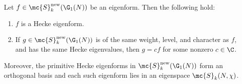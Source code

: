     \begin{theorem}\label{thm:newforms_characterization_holomorphic}
      Let $f \in \mc{S}_{k}^{\mathrm{new}}(\G_{1}(N))$ be an eigenform. Then the following hold:
      \begin{enumerate}[label=(\roman*)]
        \item $f$ is a Hecke eigenform.
        \item If $g \in \mc{S}_{k}^{\mathrm{new}}(\G_{1}(N))$ is of the same weight, level, and character as $f$, and has the same Hecke eigenvalues, then $g = cf$ for some nonzero $c \in \C$.
      \end{enumerate}
      Moreover, the primitive Hecke eigenforms in $\mc{S}_{k}^{\mathrm{new}}(\G_{1}(N))$ form an orthogonal basis and each such eigenform lies in an eigenspace $\mc{S}_{k}(N,\chi)$.
    \end{theorem}
